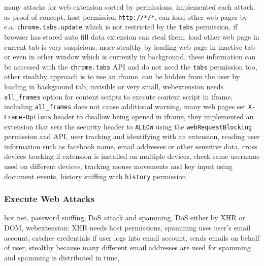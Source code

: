 			\cite{extensions:cns14} many attacks for web extension sorted by permissions, implemented each attack as proof of concept, host permission \texttt{http://*/*}, can load other web pages by e.a. \texttt{chrome.tabs.update} which is not restricted by the \texttt{tabs} permission, if browser has stored auto fill data extension can steal them, load other web page in current tab is very suspicious, more stealthy by loading web page in inactive tab or even in other window which is currently in background, these information can be accessed with the \texttt{chrome.tabs} API and do not need the \texttt{tabs} permission too, other stealthy approach is to use an iframe, can be hidden from the user by loading in background tab, invisible or very small, webextension needs \texttt{all_frames} option for content scripts to execute content script in iframe, including \texttt{all_frames} does not cause additional warning, many web pages set \texttt{X-Frame-Options} header to disallow being opened in iframe, they implemented an extension that sets the security header to \texttt{ALLOW} using the \texttt{webRequestBlocking} permission and API, user tracking and identifying with an extension, reading user information such as facebook name, email addresses or other sensitive data, cross devices tracking if extension is installed on multiple devices, check same username used on different devices, tracking mouse movements and key input using document events, history sniffing with \texttt{history} permission \\
	 
	 	\subsubsection{Execute Web Attacks}
	 	
	 		\cite{liu2011botnet, Liu12chromeextensions:} bot net, password sniffing, DoS attack and spamming, DoS either by XHR or DOM, webextension: XHR needs host permissions, spamming uses user's email account, catches credentials if user logs into email account, sends emails on behalf of user, stealthy because many different email addresses are used for spamming and spamming is distributed in time, \\
	 	
